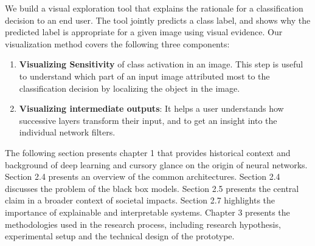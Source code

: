 We build a visual exploration tool that explains the rationale for a classification decision to an end user. The tool jointly predicts a class label,  and shows why the predicted label is appropriate for a given image using visual evidence. Our visualization method covers the following three components:


\begin{enumerate}
\item \textbf{Visualizing  Sensitivity} of class activation in an image. This step is useful to understand which part of an input image attributed most to the classification decision by localizing the object in the image.


\item  \textbf{Visualizing intermediate outputs}: It helps a user understands how successive layers transform their input, and to get an insight into the individual network filters.

\end{enumerate}


The following section presents chapter 1 that provides historical context and background of deep learning and cursory glance on the origin of neural networks.  Section 2.4 presents an overview of the common architectures.  Section 2.4 discusses the problem of the black box models.  Section 2.5 presents the central claim in a broader context of societal impacts.  Section 2.7 highlights the importance of explainable and interpretable systems.  Chapter 3 presents the methodologies used in the research process, including research hypothesis, experimental setup and the technical design of the prototype.

  



